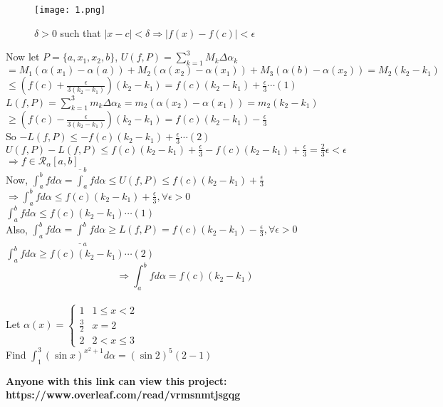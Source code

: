 \documentclass[12pt]{amsbook}
\begin{document}
\begin{figure}
\centering
    \texttt{[image: 1.png]}
    {\color{teal}\caption{$\delta>0$ such that $|x-c|<\delta\Rightarrow|f(x)-f(c)|<\epsilon$}}
\end{figure}

\begin{tcolorbox}[colback=brown!5!white,colframe=brown!60!black]
Now let $P=\{a,x_1,x_2,b\}$, $U(f,P)=\sum_{k=1}^3 M_k\Delta\alpha_k$\\
$=M_1(\alpha(x_1)-\alpha(a))+M_2(\alpha(x_2)-\alpha(x_1))+M_3(\alpha(b)-\alpha(x_2))=M_2(k_2-k_1)$\\
$\leq\left(f(c)+\frac{\epsilon}{3(k_2-k_1)}\right)(k_2-k_1)=f(c)(k_2-k_1)+\frac{\epsilon}{3}\cdots (1)$\\
$L(f,P)=\sum_{k=1}^3
m_k\Delta\alpha_k=m_2(\alpha(x_2)-\alpha(x_1))=m_2(k_2-k_1)$\\
$\geq\left( f(c)-\frac{\epsilon}{3(k_2-k_1)}\right)(k_2-k_1)=f(c)(k_2-k_1)-\frac{\epsilon}{3}$\\
So $-L(f,P)\leq-f(c)(k_2-k_1)+\frac{\epsilon}{3}\cdots (2)$\\
$U(f,P)-L(f,P)\leq f(c)(k_2-k_1)+\frac{\epsilon}{3}-f(c)(k_2-k_1)+\frac{\epsilon}{3}=\frac{2}{3}\epsilon<\epsilon$\\
$\Rightarrow f\in\mathscr{R}_\alpha[a,b]$ {}\\
Now, $\int_a^b fd\alpha=\overline{\int}_a^b fd\alpha\leq U(f,P)\leq f(c)(k_2-k_1)+\frac{\epsilon}{3}$\\
$\Rightarrow\int_a^b fd\alpha\leq f(c)(k_2-k_1)+\frac{\epsilon}{3}, \forall\epsilon>0$\\
$\int_a^b fd\alpha\leq f(c)(k_2-k_1)\cdots (1)$\\
Also, $\int_a^b fd\alpha=\underline{\int}_a^b fd\alpha\geq L(f,P)=f(c)(k_2-k_1)-\frac{\epsilon}{3},\forall \epsilon>0$\\
$\int_a^b fd\alpha\geq f(c)(k_2-k_1)\cdots (2)$
$$\Rightarrow\int_a^b fd\alpha=f(c)(k_2-k_1)$$
\noindent{\color{teal} \rule{\linewidth}{0.8mm} }\\
{} Let $\alpha(x)=\begin{cases}
1 & 1\leq x<2\\
\frac{3}{2} & x=2\\
2 & 2<x\leq 3
\end{cases}$\\
Find $\int_1^3 (\sin x)^{x^2+1}d\alpha=(\sin 2)^5(2-1)$
\end{tcolorbox}

\begin{tcolorbox}[colback=brown!10!white,colframe=brown!50!black]
\begin{center}
    \textbf{Anyone with this link can view this project:\\
    https://www.overleaf.com/read/vrmsnmtjsgqg}

\end{center}
\end{tcolorbox}
\end{document}
